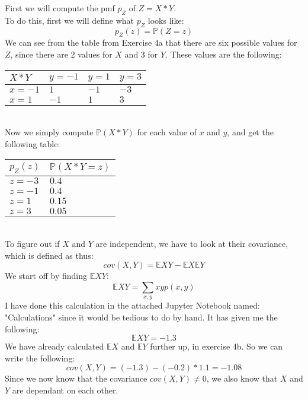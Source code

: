 First we will compute the pmf $p_Z$ of $Z = X*Y$.\\
To do this, first we will define what $p_Z$ looks like:
$$
p_Z(z) = \mathbb{P}(Z = z)
$$
We can see from the table from Exercise 4a that there are six possible values for $Z$, since there are 2 values for $X$ and 3 for $Y$. These values are the following:
\\
\begin{tabular}{l||l|l|l}
$X*Y$   & $y=-1$ & $y=1$ & $y=3$ \\ \hline
$x=-1$  & $1$    & $-1$  & $-3$  \\ \hline
$x = 1$ & $-1$   & $1$   & $3$
\end{tabular}\\
Now we simply compute $\mathbb{P}(X*Y)$ for each value of $x$ and $y$, and get the following table:
\\
\begin{tabular}{l|l}
$p_Z(z)$ & $\mathbb{P}(X*Y = z)$  \\ \hline
$z = -3$ & $0.4$  \\ \hline
$z = -1$ & $0.4$  \\ \hline
$z = 1$  & $0.15$ \\ \hline
$z = 3$  & $0.05$ \\ \hline
\end{tabular}\\
To figure out if $X$ and $Y$ are independent, we have to look at their covariance, which is defined as thus:
$$
cov(X,Y) = \mathbb{E}XY - \mathbb{E}X\mathbb{E}Y
$$
We start off by finding $\mathbb{E}XY$:
$$
\mathbb{E}XY = \sum_{x,y} xyp(x,y)
$$
I have done this calculation in the attached Jupyter Notebook named: "Calculations" since it would be tedious to do by hand. It has given me the following:
$$
\mathbb{E}XY = -1.3
$$
We have already calculated $\mathbb{E}X$ and $\mathbb{E}Y$ further up, in exercise 4b. So we can write the following:
$$
cov(X,Y) = (-1.3) - (-0.2)*1.1 = -1.08
$$
Since we now know that the covariance $cov(X,Y) \neq 0$, we also know that $X$ and $Y$ are dependant on each other.